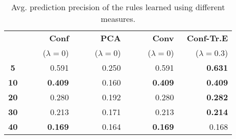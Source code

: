 \begin{table}[t]
\begin{tabular}{|c|r r r r|}
 \cline{2-5}
 & \textbf{{~~~~~}Conf}&  \textbf{{~~~~~}PCA} & \textbf{{~~~~~}Conv} &\textbf{{~}Conf-Tr.E}\\
  & {\scriptsize($\lambda=0$)} & {\scriptsize($\lambda=0$)} & {\scriptsize($\lambda=0$)} & {\scriptsize($\lambda=0.3$)}\\
 \hline
\textbf{5} & 0.591 & 0.250 & 0.591 & \textbf{0.631} \\
\textbf{10} & \textbf{0.409} & 0.160 & \textbf{0.409} & \textbf{0.409} \\
\textbf{20} & 0.280 & 0.192 & 0.280 & \textbf{0.282} \\
\textbf{30} & 0.213 & 0.171 & 0.213 & \textbf{0.214} \\
\textbf{40} & \textbf{0.169} & 0.164 & \textbf{0.169} & 0.168 \\
 \hline
\end{tabular}
\caption{Avg. prediction precision of the rules learned using different measures.}
\label{table:avg_quality}
\end{table}
